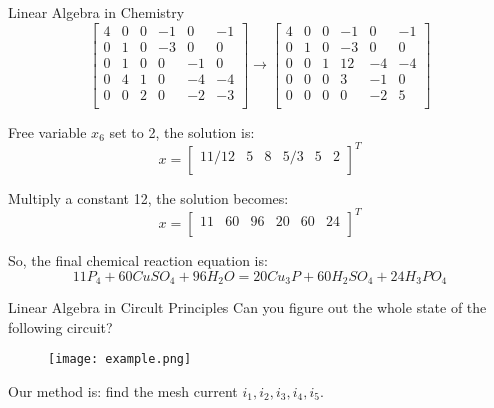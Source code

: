 \documentclass{beamer}
\begin{document}
\begin{frame}{Linear Algebra in Chemistry}
\begin{equation*}
    \left[ \begin{matrix}
        4&		0&		0&		-1&		0&		-1\\
        0&		1&		0&		-3&		0&		0\\
        0&		1&		0&		0&		-1&		0\\
        0&		4&		1&		0&		-4&		-4\\
        0&		0&		2&		0&		-2&		-3\\
    \end{matrix} \right] \rightarrow \left[ \begin{matrix}
        4&		0&		0&		-1&		0&		-1\\
        0&		1&		0&		-3&		0&		0\\
        0&		0&		1&		12&		-4&		-4\\
        0&		0&		0&		3&		-1&		0\\
        0&		0&		0&		0&		-2&		5\\
    \end{matrix} \right]
\end{equation*}

Free variable $x_6$ set to 2, the solution is:
\begin{equation*}
    x=\left[ \begin{matrix}
        11/12&		5&		8&		5/3&		5&		2\\
    \end{matrix} \right] ^T
\end{equation*}

Multiply a constant 12, the solution becomes:
\begin{equation*}
    x=\left[ \begin{matrix}
        11&		60&		96&		20&		60&		24\\
    \end{matrix} \right] ^T
\end{equation*}

So, the final chemical reaction equation is:
\begin{equation*}
    11P_4+60CuSO_4+96H_2O= 20Cu_3P+60H_2SO_4+24H_3PO_4
\end{equation*}
\end{frame}

\begin{frame}{Linear Algebra in Circult Principles}
Can you figure out the whole state of the following circuit?

\begin{figure}
    \centering
    \texttt{[image: example.png]}
\end{figure}

Our method is: find the mesh current $i_1, i_2, i_3, i_4, i_5$.
\end{frame}
\end{document}
